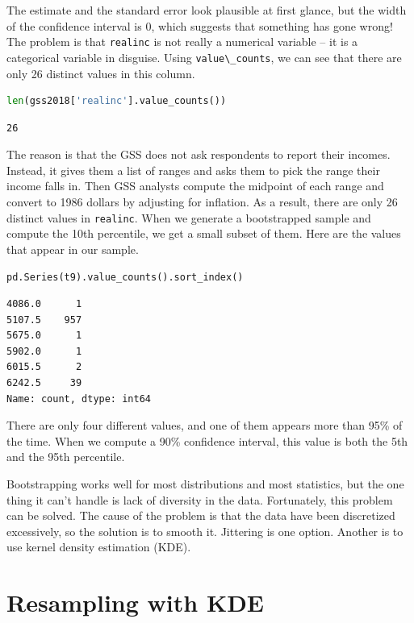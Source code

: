 The estimate and the standard error look plausible at first glance, but
the width of the confidence interval is 0, which suggests that something
has gone wrong! The problem is that \passthrough{\lstinline!realinc!} is
not really a numerical variable -- it is a categorical variable in
disguise. Using \passthrough{\lstinline!value\_counts!}, we can see that
there are only 26 distinct values in this column.

\begin{lstlisting}[language=Python,style=source]
len(gss2018['realinc'].value_counts())
\end{lstlisting}

\begin{lstlisting}[style=output]
26
\end{lstlisting}

The reason is that the GSS does not ask respondents to report their
incomes. Instead, it gives them a list of ranges and asks them to pick
the range their income falls in. Then GSS analysts compute the midpoint
of each range and convert to 1986 dollars by adjusting for inflation. As
a result, there are only 26 distinct values in
\passthrough{\lstinline!realinc!}. When we generate a bootstrapped
sample and compute the 10th percentile, we get a small subset of them.
Here are the values that appear in our sample.

\begin{lstlisting}[language=Python,style=source]
pd.Series(t9).value_counts().sort_index()
\end{lstlisting}

\begin{lstlisting}[style=output]
4086.0      1
5107.5    957
5675.0      1
5902.0      1
6015.5      2
6242.5     39
Name: count, dtype: int64
\end{lstlisting}

There are only four different values, and one of them appears more than
95\% of the time. When we compute a 90\% confidence interval, this value
is both the 5th and the 95th percentile.

Bootstrapping works well for most distributions and most statistics, but
the one thing it can't handle is lack of diversity in the data.
Fortunately, this problem can be solved. The cause of the problem is
that the data have been discretized excessively, so the solution is to
smooth it. Jittering is one option. Another is to use kernel density
estimation (KDE).

\hypertarget{resampling-with-kde}{%
\section{Resampling with KDE}\label{resampling-with-kde}}

